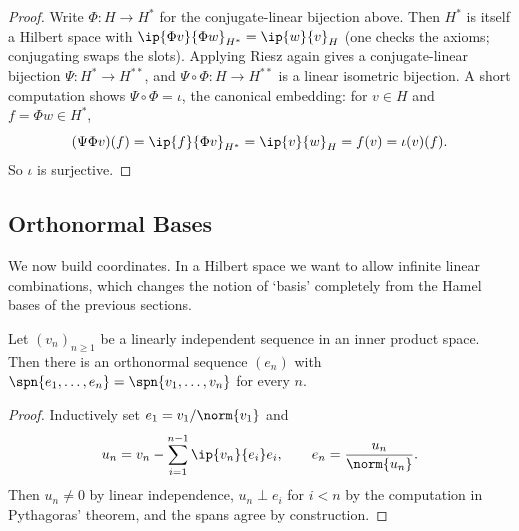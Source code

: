 \begin{proof}
	Write $\Phi : H \to H^*$ for the conjugate-linear bijection above. Then $H^*$ is itself a Hilbert space with $\ip{\Phi v}{\Phi w}_{H^*} = \ip{w}{v}_H$ (one checks the axioms; conjugating swaps the slots). Applying Riesz again gives a conjugate-linear bijection $\Psi : H^* \to H^{**}$, and $\Psi\circ\Phi : H \to H^{**}$ is a linear isometric bijection. A short computation shows $\Psi \circ \Phi = \iota$, the canonical embedding: for $v \in H$ and $f = \Phi w \in H^*$,
	$$(\Psi\Phi v)(f) = \ip{f}{\Phi v}_{H^*} = \ip{v}{w}_H = f(v) = \iota(v)(f).$$
	So $\iota$ is surjective.
\end{proof}

\subsection{Orthonormal Bases}

We now build coordinates. In a Hilbert space we want to allow infinite linear combinations, which changes the notion of `basis' completely from the Hamel bases of the previous sections.

\begin{proposition}
	Let $(v_n)_{n \geq 1}$ be a linearly independent sequence in an inner product space. Then there is an orthonormal sequence $(e_n)$ with $\spn\{e_1,\dots,e_n\} = \spn\{v_1,\dots,v_n\}$ for every $n$.
\end{proposition}

\begin{proof}
	Inductively set $e_1 = v_1/\norm{v_1}$ and
	$$u_n = v_n - \sum_{i=1}^{n-1}\ip{v_n}{e_i}e_i, \qquad e_n = \frac{u_n}{\norm{u_n}}.$$
	Then $u_n \neq 0$ by linear independence, $u_n \perp e_i$ for $i<n$ by the computation in Pythagoras' theorem, and the spans agree by construction.
\end{proof}

